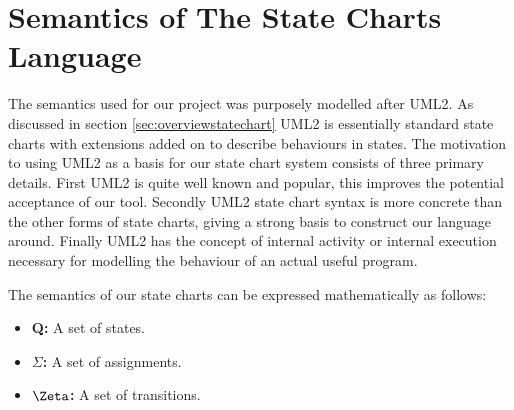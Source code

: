 \section{Semantics of The State Charts Language}

The semantics used for our project was purposely modelled after UML2. As discussed in section \ref{sec:overviewstatechart} UML2 is essentially standard state charts with extensions added on to describe behaviours in states. The motivation to using UML2 as a basis for our state chart system consists of three primary details. First UML2 is quite well known and popular, this improves the potential acceptance of our tool. Secondly UML2 state chart syntax is more concrete than the other forms of state charts, giving a strong basis to construct our language around. Finally UML2 has the concept of internal activity or internal execution necessary for modelling the behaviour of an actual useful program.

The semantics of our state charts can be expressed mathematically as follows:

\begin{itemize}
	\item \textbf{Q:} A set of states.
	\item \textbf{$\Sigma$:} A set of assignments.
	\item \textbf{$\Zeta$:} A set of transitions.
\end{itemize}